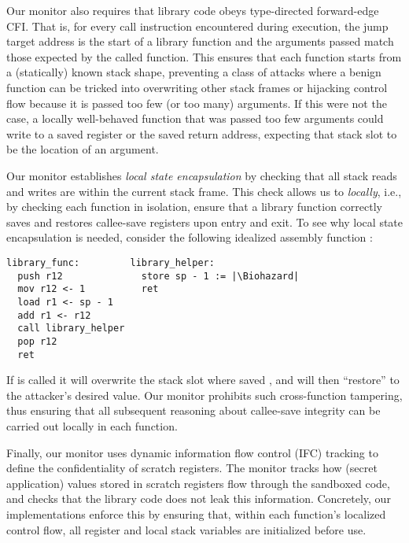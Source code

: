 %
Our monitor also requires that library code obeys type-directed forward-edge
CFI.
%
That is, for every call instruction encountered during execution, the jump
target address is the start of a library function and the arguments
passed match those expected by the called function.
%
This ensures that each function starts from a (statically) known stack
shape, preventing a class of attacks where a benign function can be tricked into
overwriting other stack frames or hijacking control flow because it is passed
too few (or too many) arguments.
%
If this were not the case, a locally well-behaved function that was passed too
few arguments could write to a saved register or the saved return address,
expecting that stack slot to be the location of an argument.

%
Our monitor establishes \emph{local state encapsulation} by checking
that all stack reads and writes are within the current stack frame.
%
This check allows us to \emph{locally}, i.e., by checking each function in
isolation, ensure that a library function correctly saves and restores
callee-save registers upon entry and exit.
%
To see why local state encapsulation is needed, consider
the following idealized assembly function :
%
\begin{lstlisting}[style=asm, escapeinside=||, morekeywords={library_func:, library_helper:}]
library_func:         library_helper:
  push r12              store sp - 1 := |\Biohazard|
  mov r12 <- 1          ret
  load r1 <- sp - 1
  add r1 <- r12
  call library_helper
  pop r12
  ret
\end{lstlisting}
%
If  is called it will overwrite the stack slot where
 saved , and 
will then ``restore''  to the attacker's desired value.
%
Our monitor prohibits such cross-function tampering, thus ensuring that
all subsequent reasoning about callee-save integrity can be carried out
locally in each function.

%
Finally, our monitor uses dynamic information flow control (IFC) tracking to
define the confidentiality of scratch registers.
%
The monitor tracks how (secret application) values stored in scratch registers
flow through the sandboxed code, and checks that the library code does not leak
this information.
%
Concretely, our implementations enforce this by ensuring that, within each
function's localized control flow, all register and local stack
variables are initialized before use.

